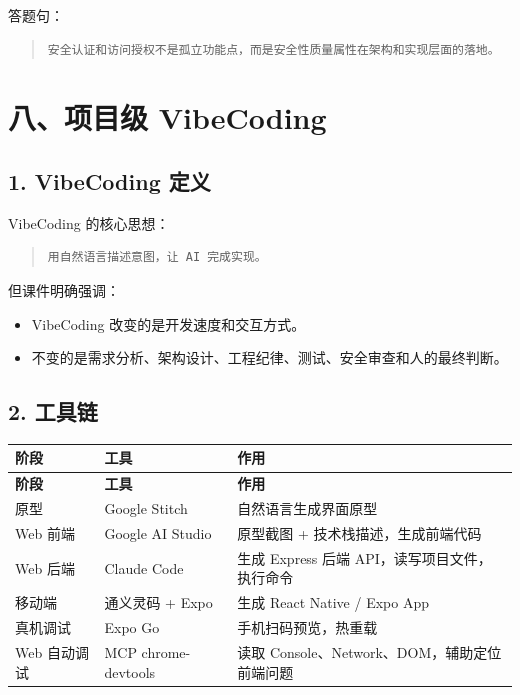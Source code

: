 \documentclass[UTF8,zihao=-4]{ctexart}
\begin{document}
答题句：

\begin{quote}
\footnotesize
\begin{verbatim}
安全认证和访问授权不是孤立功能点，而是安全性质量属性在架构和实现层面的落地。
\end{verbatim}
\end{quote}

\section{八、项目级 VibeCoding}

\subsection{1. VibeCoding 定义}

VibeCoding 的核心思想：

\begin{quote}
\footnotesize
\begin{verbatim}
用自然语言描述意图，让 AI 完成实现。
\end{verbatim}
\end{quote}

但课件明确强调：

\begin{itemize}
\item VibeCoding 改变的是开发速度和交互方式。
\item 不变的是需求分析、架构设计、工程纪律、测试、安全审查和人的最终判断。
\end{itemize}

\subsection{2. 工具链}

{
\footnotesize
\begin{longtable}{|>{\raggedright\arraybackslash}p{}|>{\raggedright\arraybackslash}p{}|>{\raggedright\arraybackslash}p{}|}
\hline
\textbf{阶段} & \textbf{工具} & \textbf{作用} \\
\hline
\endfirsthead
\hline
\textbf{阶段} & \textbf{工具} & \textbf{作用} \\
\hline
\endhead
原型 & Google Stitch & 自然语言生成界面原型 \\
\hline
Web 前端 & Google AI Studio & 原型截图 + 技术栈描述，生成前端代码 \\
\hline
Web 后端 & Claude Code & 生成 Express 后端 API，读写项目文件，执行命令 \\
\hline
移动端 & 通义灵码 + Expo & 生成 React Native / Expo App \\
\hline
真机调试 & Expo Go & 手机扫码预览，热重载 \\
\hline
Web 自动调试 & MCP chrome-devtools & 读取 Console、Network、DOM，辅助定位前端问题 \\
\hline
\end{longtable}
}
\end{document}
